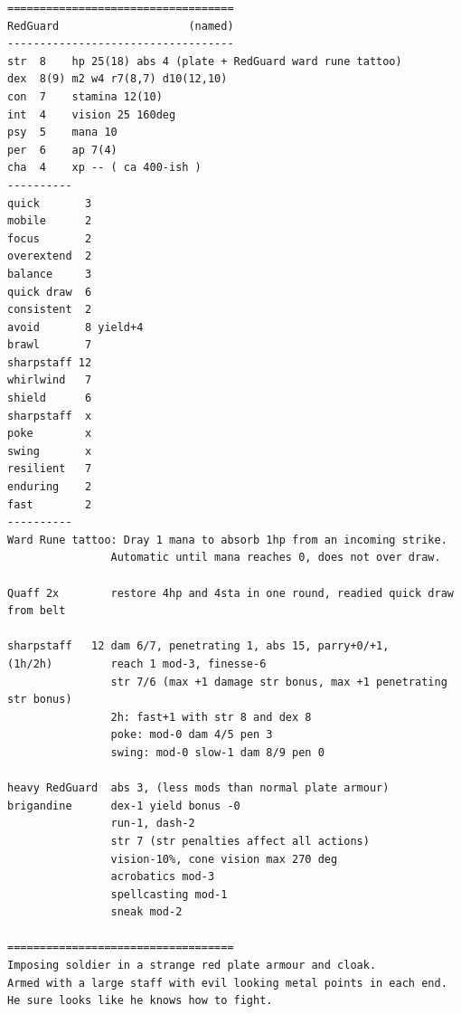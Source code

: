 \goodbreak \begin{samepage} \vsmall \begin{verbatim}
===================================
RedGuard                    (named)
-----------------------------------
str  8    hp 25(18) abs 4 (plate + RedGuard ward rune tattoo)
dex  8(9) m2 w4 r7(8,7) d10(12,10)
con  7    stamina 12(10)
int  4    vision 25 160deg
psy  5    mana 10
per  6    ap 7(4)
cha  4    xp -- ( ca 400-ish )
----------
quick       3
mobile      2
focus       2
overextend  2
balance     3
quick draw  6
consistent  2
avoid       8 yield+4
brawl       7
sharpstaff 12
whirlwind   7
shield      6
sharpstaff  x
poke        x
swing       x
resilient   7
enduring    2
fast        2
----------
Ward Rune tattoo: Dray 1 mana to absorb 1hp from an incoming strike.
                Automatic until mana reaches 0, does not over draw.

Quaff 2x        restore 4hp and 4sta in one round, readied quick draw from belt

sharpstaff   12 dam 6/7, penetrating 1, abs 15, parry+0/+1,
(1h/2h)         reach 1 mod-3, finesse-6
                str 7/6 (max +1 damage str bonus, max +1 penetrating str bonus)
                2h: fast+1 with str 8 and dex 8
                poke: mod-0 dam 4/5 pen 3
                swing: mod-0 slow-1 dam 8/9 pen 0

heavy RedGuard  abs 3, (less mods than normal plate armour)
brigandine      dex-1 yield bonus -0
                run-1, dash-2
                str 7 (str penalties affect all actions)
                vision-10%, cone vision max 270 deg
                acrobatics mod-3
                spellcasting mod-1
                sneak mod-2

===================================
Imposing soldier in a strange red plate armour and cloak.
Armed with a large staff with evil looking metal points in each end.
He sure looks like he knows how to fight.
\end{verbatim} \normalsize \end{samepage}

\

